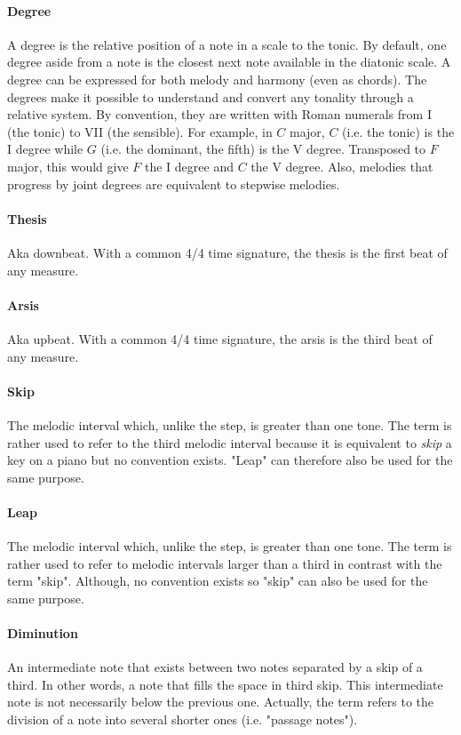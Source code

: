 \paragraph{Degree} A degree is the relative position of a note in a scale to the tonic. By default, one degree aside from a note is the closest next note available in the diatonic scale. A degree can be expressed for both melody and harmony (even as chords). The degrees make it possible to understand and convert any tonality through a relative system\parencite{Degree}. By convention, they are written with Roman numerals from I (the tonic) to VII (the sensible). For example, in $C$ major, $C$ (i.e. the tonic) is the I degree while $G$ (i.e. the dominant, the fifth) is the V degree. Transposed to $F$ major, this would give $F$ the I degree and $C$ the V degree. Also, melodies that progress by joint degrees are equivalent to stepwise melodies.

\paragraph{Thesis} Aka downbeat. With a common 4/4 time signature, the thesis is the first beat of any measure.

\paragraph{Arsis} Aka upbeat. With a common 4/4 time signature, the arsis is the third beat of any measure.

\paragraph{Skip} The melodic interval which, unlike the step, is greater than one tone. The term is rather used to refer to the third melodic interval because it is equivalent to \textit{skip} a key on a piano but no convention exists. "Leap" can therefore also be used for the same purpose.

\paragraph{Leap} The melodic interval which, unlike the step, is greater than one tone. The term is rather used to refer to melodic intervals larger than a third in contrast with the term "skip". Although, no convention exists so "skip" can also be used for the same purpose.

\paragraph{Diminution} An intermediate note that exists between two notes separated by a skip of a third. In other words, a note that fills the space in third skip. This intermediate note is not necessarily below the previous one. Actually, the term refers to the division of a note into several shorter ones (i.e. "passage notes")\parencite{Diminution}.
